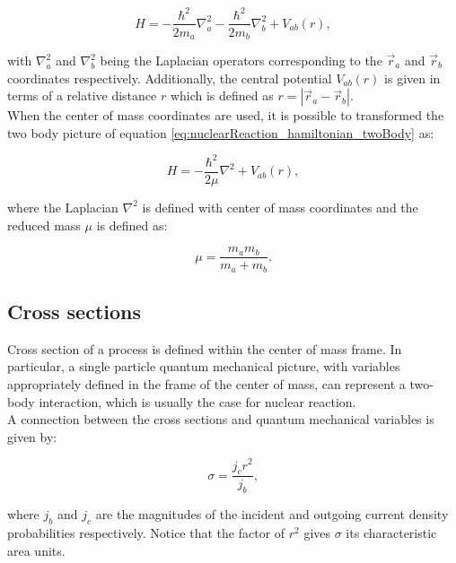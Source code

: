 \documentclass[openany]{book}
\begin{document}
\begin{equation}\label{eq:nuclearReaction_hamiltonian_twoBody}
	H = - \frac{\hbar^2}{2m_a} \nabla^2_a  - \frac{\hbar^2}{2m_b} \nabla^2_b + V_{ab}(r),
\end{equation}

with $\nabla^2_a$ and   $\nabla^2_b$ being the Laplacian operators corresponding to the  $\vec r_a $ and $\vec r_b$  coordinates respectively. Additionally, the central potential $ V_{ab}(r)$ is given in terms of a relative distance $r$ which is defined as $r = |\vec r_a - \vec r_b|$. \\

When the center of mass coordinates are used, it is possible to transformed the two body picture of equation \ref{eq:nuclearReaction_hamiltonian_twoBody} as: 

\begin{equation}\label{eq:nuclearReaction_hamiltonian_centerMass}
	H = - \frac{\hbar^2}{2\mu} \nabla^2  + V_{ab}(r),
\end{equation}

where the Laplacian $ \nabla^2$ is defined with center of mass coordinates and the reduced mass $\mu$ is defined as: 

\begin{equation}\label{eq:nuclearReaction_reducedMass}
	\mu = \frac{m_a m_b}{m_a + m_b}.
\end{equation}

\subsection{Cross sections} \label{sub:crossSections}

Cross section of a process is defined within the center of mass frame. In particular, a single particle quantum mechanical picture, with variables appropriately defined in the frame of the center of mass, can represent a two-body interaction, which is usually the case for nuclear reaction. \\

A connection between the cross sections and quantum mechanical variables is given by: 

\begin{equation}\label{eq:nuclearReaction_crossSection_quantumMechanics}
	\sigma = \frac{j_c r^2 }{j_b},
\end{equation}

where $j_b$ and $j_c$ are the magnitudes of the incident and outgoing current density probabilities respectively. Notice that the factor of $r^2$ gives $\sigma$ its characteristic area units. \\
\end{document}

